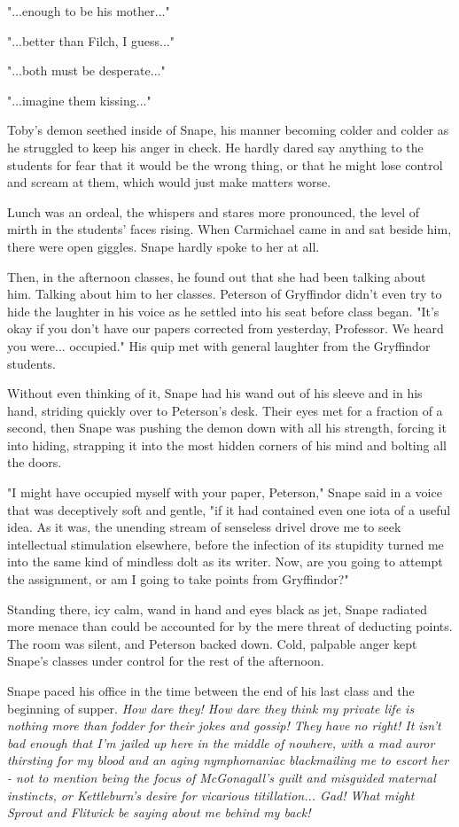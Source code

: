 \documentclass[a4paper,11pt]{article}
\begin{document}
"...enough to be his mother..."

"...better than Filch, I guess..."

"...both must be desperate..."

"...imagine them kissing..."

Toby's demon seethed inside of Snape, his manner becoming colder and colder as he struggled to keep his anger in check. He hardly dared say anything to the students for fear that it would be the wrong thing, or that he might lose control and scream at them, which would just make matters worse.

Lunch was an ordeal, the whispers and stares more pronounced, the level of mirth in the students' faces rising. When Carmichael came in and sat beside him, there were open giggles. Snape hardly spoke to her at all.

Then, in the afternoon classes, he found out that she had been talking about him. Talking about him to her classes. Peterson of Gryffindor didn't even try to hide the laughter in his voice as he settled into his seat before class began. "It's okay if you don't have our papers corrected from yesterday, Professor. We heard you were... occupied." His quip met with general laughter from the Gryffindor students.

Without even thinking of it, Snape had his wand out of his sleeve and in his hand, striding quickly over to Peterson's desk. Their eyes met for a fraction of a second, then Snape was pushing the demon down with all his strength, forcing it into hiding, strapping it into the most hidden corners of his mind and bolting all the doors.

"I might have occupied myself with your paper, Peterson," Snape said in a voice that was deceptively soft and gentle, "if it had contained even one iota of a useful idea. As it was, the unending stream of senseless drivel drove me to seek intellectual stimulation elsewhere, before the infection of its stupidity turned me into the same kind of mindless dolt as its writer. Now, are you going to attempt the assignment, or am I going to take points from Gryffindor?"

Standing there, icy calm, wand in hand and eyes black as jet, Snape radiated more menace than could be accounted for by the mere threat of deducting points. The room was silent, and Peterson backed down. Cold, palpable anger kept Snape's classes under control for the rest of the afternoon.

Snape paced his office in the time between the end of his last class and the beginning of supper. \emph{How dare they! How dare they think my private life is nothing more than fodder for their jokes and gossip! They have no right! It isn't bad enough that I'm jailed up here in the middle of nowhere, with a mad auror thirsting for my blood and an aging nymphomaniac blackmailing me to escort her - not to mention being the focus of McGonagall's guilt and misguided maternal instincts, or Kettleburn's desire for vicarious titillation... Gad! What might Sprout and Flitwick be saying about me behind my back!}
\end{document}
